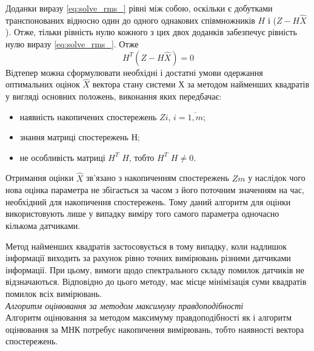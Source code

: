 Доданки виразу \eqref{eq:solve_rms_} рівні між собою, оскільки є добутками транспонованих 
відносно один до одного однакових співмножників $H$ і ($Z- H\hat{X }$). 
Отже, тільки рівність  нулю кожного з цих двох доданків забезпечує 
рівність нулю виразу \eqref{eq:solve_rms_}.
Отже                   
\[ H^{T}(Z-H \hat{X}) = 0 \]
Відтепер можна сформулювати необхідні і достатні умови одержання оптимальних оцінок $\hat{X}$
вектора стану системи $Х$ за методом найменших квадратів  
у вигляді основних положень, виконання яких передбачає:
\begin{itemize}
\item наявність накопичених спостережень $Zi$, $i=\overline{1,m}$;
\item знання матриці спостережень $Н$;
\item не особливість матриці $H^{T}$ $H$, тобто $H^{T}$ $H \ne 0$.
\end{itemize}

Отримання оцінки  $\hat{X}$  зв'язано з накопиченням спостережень  $Zm$  
у наслідок чого нова оцінка параметра не збігається за часом з його поточним значенням 
на час, необхідний для накопичення спостережень. Тому даний алгоритм для оцінки використовують 
лише у випадку виміру того самого параметра одночасно кількома датчиками.

Метод найменших квадратів застосовується в тому випадку, коли надлишок інформації 
виходить за рахунок рівно точних вимірювань різними датчиками інформації. При цьому, 
вимоги щодо спектрального складу помилок датчиків не відзначаються. Відповідно до 
цього методу, має місце мінімізація суми квадратів помилок всіх вимірювань. \\

\textit{Алгоритм оцінювання за методом максимуму правдоподібності}\\

Алгоритм оцінювання за методом максимуму правдоподібності  як і алгоритм оцінювання 
за МНК потребує накопичення вимірювань, тобто наявності вектора спостережень. 

